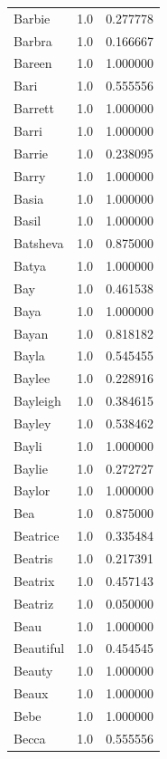 \documentclass[
  letterpaper,
  DIV=11,
  numbers=noendperiod]{scrreprt}
\begin{document}
\begin{tabular}{lrr}
Barbie          &   1.0 &   0.277778 \\
Barbra          &   1.0 &   0.166667 \\
Bareen          &   1.0 &   1.000000 \\
Bari            &   1.0 &   0.555556 \\
Barrett         &   1.0 &   1.000000 \\
Barri           &   1.0 &   1.000000 \\
Barrie          &   1.0 &   0.238095 \\
Barry           &   1.0 &   1.000000 \\
Basia           &   1.0 &   1.000000 \\
Basil           &   1.0 &   1.000000 \\
Batsheva        &   1.0 &   0.875000 \\
Batya           &   1.0 &   1.000000 \\
Bay             &   1.0 &   0.461538 \\
Baya            &   1.0 &   1.000000 \\
Bayan           &   1.0 &   0.818182 \\
Bayla           &   1.0 &   0.545455 \\
Baylee          &   1.0 &   0.228916 \\
Bayleigh        &   1.0 &   0.384615 \\
Bayley          &   1.0 &   0.538462 \\
Bayli           &   1.0 &   1.000000 \\
Baylie          &   1.0 &   0.272727 \\
Baylor          &   1.0 &   1.000000 \\
Bea             &   1.0 &   0.875000 \\
Beatrice        &   1.0 &   0.335484 \\
Beatris         &   1.0 &   0.217391 \\
Beatrix         &   1.0 &   0.457143 \\
Beatriz         &   1.0 &   0.050000 \\
Beau            &   1.0 &   1.000000 \\
Beautiful       &   1.0 &   0.454545 \\
Beauty          &   1.0 &   1.000000 \\
Beaux           &   1.0 &   1.000000 \\
Bebe            &   1.0 &   1.000000 \\
Becca           &   1.0 &   0.555556 \\

\end{tabular}
\end{document}
